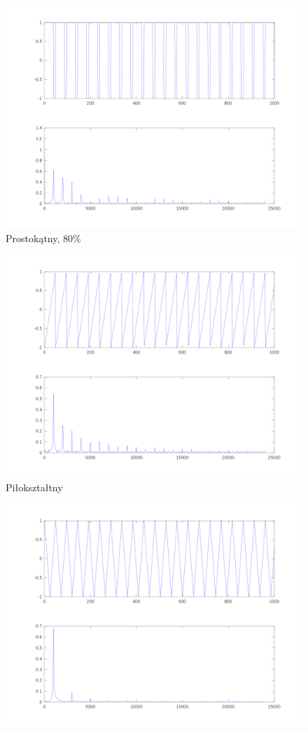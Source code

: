 \documentclass[11pt,a4paper]{article}
\begin{document}
\begin{enumerate}
\begin{figure}
\includegraphics[scale=0.5]{proba1_4.png}
\caption{Prostokątny, 80\%}
\label{fig:pros80}
\end{figure}
\begin{figure}
\hspace{-10em}
\includegraphics[scale=0.5]{proba1_2.png}
\caption{Piłokształtny}
\label{fig:pila}
\end{figure}
\begin{figure}
\hspace{-10em}
\includegraphics[scale=0.5]{proba1_3.png}

\end{figure}
\end{enumerate}
\end{document}
